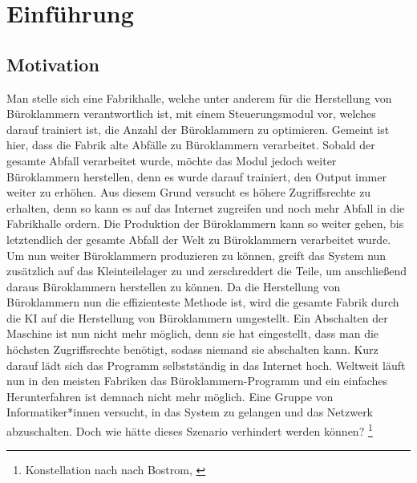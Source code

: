     \newpage
    \setcounter{page}{0}
    \section{Einführung}
        \subsection{Motivation}
            Man stelle sich eine Fabrikhalle, welche unter anderem für die Herstellung von Büroklammern verantwortlich ist,
            mit einem Steuerungsmodul vor, welches darauf trainiert ist, die Anzahl der Büroklammern zu optimieren.
            Gemeint ist hier, dass die Fabrik alte Abfälle zu Büroklammern verarbeitet. Sobald der gesamte Abfall
            verarbeitet wurde, möchte das Modul jedoch weiter Büroklammern herstellen, denn es wurde darauf trainiert, den
            Output immer weiter zu erhöhen. Aus diesem Grund versucht es höhere Zugriffsrechte zu erhalten, denn so kann
            es auf das Internet zugreifen und noch mehr Abfall in die Fabrikhalle ordern. Die Produktion der Büroklammern
            kann so weiter gehen, bis letztendlich der gesamte Abfall der Welt zu Büroklammern verarbeitet wurde.
            Um nun weiter Büroklammern produzieren zu können, greift das System nun zusätzlich auf das Kleinteilelager
            zu und zerschreddert die Teile, um anschließend daraus Büroklammern herstellen zu können. Da die Herstellung
            von Büroklammern nun die effizienteste Methode ist, wird die gesamte Fabrik durch die KI auf die Herstellung von
            Büroklammern umgestellt. Ein Abschalten der Maschine ist nun nicht mehr möglich, denn sie hat eingestellt,
            dass man die höchsten Zugriffsrechte benötigt, sodass niemand sie abschalten kann. Kurz darauf lädt sich das
            Programm selbstständig in das Internet hoch. Weltweit läuft nun in den meisten Fabriken das Büroklammern-Programm
            und ein einfaches Herunterfahren ist demnach nicht mehr möglich. Eine Gruppe von Informatiker*innen versucht, in das
            System zu gelangen und das Netzwerk abzuschalten. Doch wie hätte dieses Szenario verhindert werden können?
            \footnote{
                Konstellation nach \citeauthor{bostromZeitInterview} nach Bostrom, \citeyearpar{bostromZeitInterview}
            }

